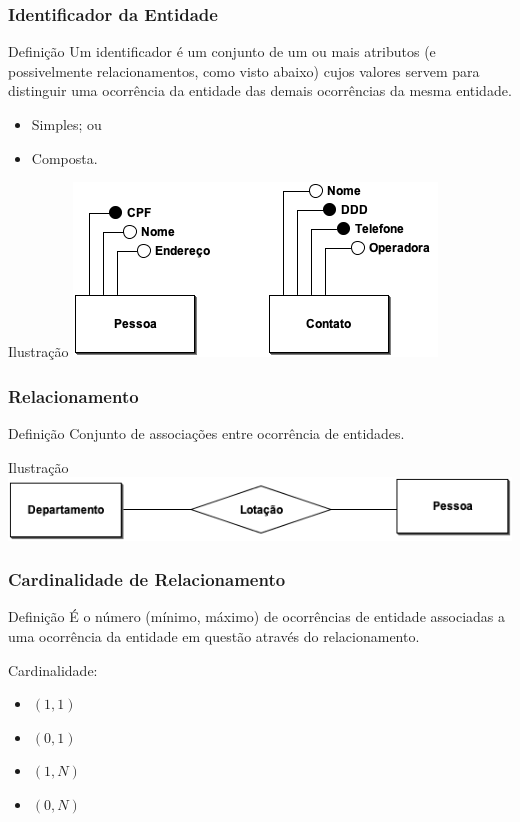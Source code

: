 \documentclass{beamer}
\begin{document}
\begin{frame}
\frametitle{Identificador da Entidade}

\begin{block}{Definição}
	Um identificador é um conjunto de um ou mais atributos (e possivelmente
	relacionamentos, como visto abaixo) cujos valores servem para distinguir
	uma ocorrência da entidade das demais ocorrências da mesma entidade.
\end{block} \vfill

\begin{itemize}
	\item Simples; ou
	\item Composta.
\end{itemize} \vfill

\begin{exampleblock}{Ilustração}
	\centering
	\includegraphics[scale=2]{img/atributo-identificado}
\end{exampleblock}
\end{frame}

\begin{frame}
\frametitle{Relacionamento}

\begin{block}{Definição}
	Conjunto de associações entre ocorrência de entidades.
\end{block}\vfill

\begin{exampleblock}{Ilustração}
	\centering
	\includegraphics[scale=2.5]{img/relacionamento}
\end{exampleblock}
\end{frame}

\begin{frame}
\frametitle{Cardinalidade de Relacionamento}

\begin{block}{Definição}
É o número (mínimo, máximo) de ocorrências de entidade associadas a
uma ocorrência da entidade em questão através do relacionamento.
\end{block} \vfill

	Cardinalidade:
	\begin{itemize}
	\item $(1,1)$ 
	\item $(0,1)$ 
	\item $(1,N)$
	\item $(0,N)$
	\end{itemize}
\end{frame}
\end{document}
